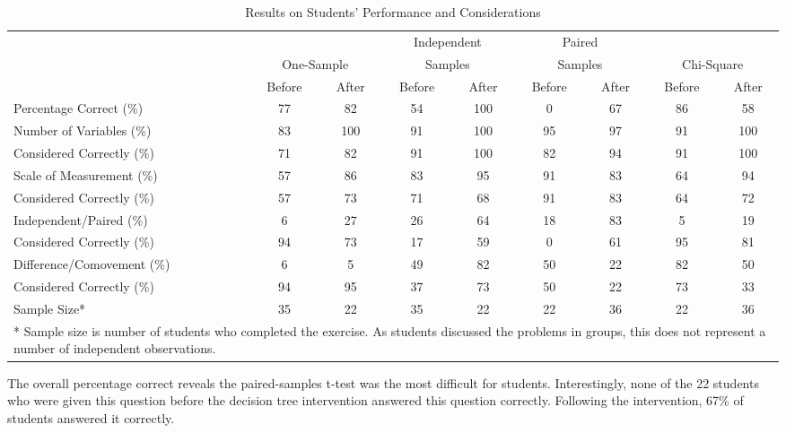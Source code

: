 \documentclass[12pt]{article}
\begin{document}
\begin{table}\caption{Results on Students' Performance and Considerations}\label{tb:results} \vspace*{1pc}
\begin{tabular}{p{2.05in}|cc|cc|cc|cc} 
\multicolumn{1}{c}{}  & \multicolumn{2}{p{0.9in}}{} & \multicolumn{2}{p{0.9in}}{\centering Independent} & \multicolumn{2}{p{0.9in}}{\centering Paired} & \multicolumn{2}{p{0.9in}}{} \\
\multicolumn{1}{c}{}  & \multicolumn{2}{|p{0.9in}|}{\centering One-Sample} & \multicolumn{2}{|p{0.9in}|}{\centering Samples} & \multicolumn{2}{|p{0.9in}|}{\centering Samples} & \multicolumn{2}{|p{0.9in}}{\centering Chi-Square} \\ \hline
  & Before	&	After	&	Before	&	After	&	Before	&	After	&	Before	&	After	\\ \hline
Percentage Correct (\%)	&	77	&	82	&	54	&	100	&	0	&	67	&	86	&	58	\\  \hline
Number of Variables (\%)    &	83	&	100	&	91	&	100	&	95	&	97	&	91	&	100	\\ 
Considered Correctly (\%)	&	71	&	82	&	91	&	100	&	82	&	94	&	91	&	100	\\ \hline
Scale of Measurement (\%) 	&	57	&	86	&	83	&	95	&	91	&	83	&	64	&	94	\\ 
Considered Correctly (\%)	&	57	&	73	&	71	&	68	&	91	&	83	&	64	&	72	\\ \hline
Independent/Paired (\%)	&	6	&	27	&	26	&	64	&	18	&	83	&	5	&	19	\\ 
Considered Correctly (\%)	&	94	&	73	&	17	&	59	&	0	&	61	&	95	&	81	\\ \hline
Difference/Comovement (\%)  &	6	&	5	&	49	&	82	&	50	&	22	&	82	&	50	\\
Considered Correctly (\%)	&	94	&	95	&	37	&	73	&	50	&	22	&	73	&	33	\\ \hline
Sample Size*	        &	35	&	22	&	35	&	22	&	22	&	36	&	22	&	36	\\  \hline
\multicolumn{9}{p{6.5in}}{\footnotesize{* Sample size is number of students who completed the exercise. As students discussed the problems in groups, this does not represent a number of independent observations.}} \\
\end{tabular}
\end{table}

The overall percentage correct reveals the paired-samples t-test was the most difficult for students.  Interestingly, none of the 22 students who were given this question before the decision tree intervention answered this question correctly.  Following the intervention, 67\% of students answered it correctly.  
\end{document}
